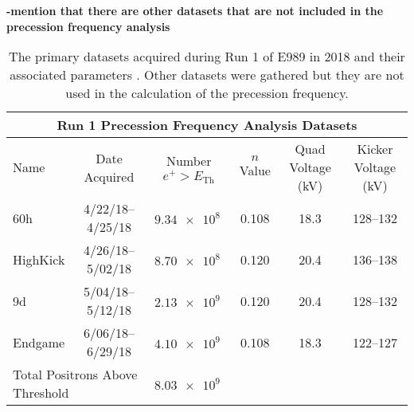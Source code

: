 \textbf{-mention that there are other datasets that are not included in the precession frequency analysis}


\begin{landscape}
\begin{table}
\centering
\setlength\tabcolsep{10pt}
\renewcommand{\arraystretch}{1.2}
\begin{tabular*}{1\linewidth}{@{\extracolsep{\fill}}lccccc}
  \hline
    \multicolumn{6}{c}{\textbf{Run 1 Precession Frequency Analysis Datasets}} \\
  \hline\hline
    Name & Date Acquired & Number $e^{+} > E_{\text{Th}}$ & $n$ Value & Quad Voltage (kV) & Kicker Voltage (kV) \\
  \hline
    60h & 4/22/18--4/25/18 & $\SI{9.34e8}{}$ & 0.108 & 18.3 & 128--132 \\
    HighKick & 4/26/18--5/02/18 & $\SI{8.70e8}{}$ & 0.120 & 20.4 & 136--138 \\
    9d & 5/04/18--5/12/18 & $\SI{2.13e9}{}$ & 0.120 & 20.4 & 128--132 \\
    Endgame & 6/06/18--6/29/18 & $\SI{4.10e9}{}$ & 0.108 & 18.3 & 122--127 \\
  \hline
    \multicolumn{2}{l}{Total Positrons Above Threshold} & \multicolumn{1}{c}{$\SI{8.03e9}{}$} & & &  \\
  \hline
\end{tabular*}
\caption[Run 1 datasets]{The primary datasets acquired during Run 1 of E989 in 2018 and their associated parameters \cite{Run1Datasets}. Other datasets were gathered but they are not used in the calculation of the precession frequency.}
\label{tab:Run1Datasets}
\end{table}
\end{landscape}



\cleardoublepage


